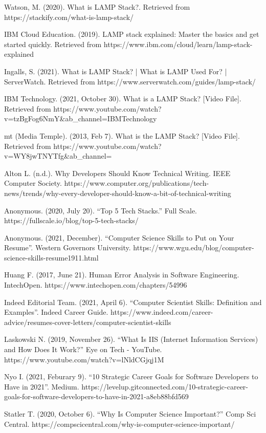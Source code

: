 \documentclass[a4paper, 11pt]{report}
\begin{document}
Watson, M. (2020). What is LAMP Stack?. Retrieved from https://stackify.com/what-is-lamp-stack/

IBM Cloud Education. (2019). LAMP stack explained: Master the basics and get started quickly. Retrieved from https://www.ibm.com/cloud/learn/lamp-stack-explained

Ingalls, S. (2021). What is LAMP Stack? | What is LAMP Used For? | ServerWatch. Retrieved from https://www.serverwatch.com/guides/lamp-stack/

IBM Technology. (2021, October 30). What is a LAMP Stack? [Video File]. Retrieved from https://www.youtube.com/watch?v=tzBgFog6NmY&ab_channel=IBMTechnology

mt (Media Temple). (2013, Feb 7). What is the LAMP Stack? [Video File]. Retrieved from https://www.youtube.com/watch?v=WY8jwTNYTfg&ab_channel=%

Alton L. (n.d.). Why Developers Should Know Technical Writing. IEEE Computer Society. 
    https://www.computer.org/publications/tech-news/trends/why-every-developer-should-know-a-bit-of-technical-writing
    
Anonymous. (2020, July 20). “Top 5 Tech Stacks.” Full Scale.
    https://fullscale.io/blog/top-5-tech-stacks/
 
Anonymous. (2021, December). “Computer Science Skills to Put on Your Resume”. Western Governors University.
    https://www.wgu.edu/blog/computer-science-skills-resume1911.html
    
Huang F. (2017, June 21). Human Error Analysis in Software Engineering. IntechOpen.
    https://www.intechopen.com/chapters/54996
    
Indeed Editorial Team. (2021, April 6). “Computer Scientist Skills: Definition and Examples”. Indeed Career Guide.
    https://www.indeed.com/career-advice/resumes-cover-letters/computer-scientist-skills
    
Laskowski N. (2019, November 26). “What Is IIS (Internet Information Services) and How Does It Work?” Eye on Tech - YouTube.
    https://www.youtube.com/watch?v=lNldCGjqj1M
    
Nyo I. (2021, Feburary 9). “10 Strategic Career Goals for Software Developers to Have in 2021”. Medium.
    https://levelup.gitconnected.com/10-strategic-career-goals-for-software-developers-to-have-in-2021-a8eb88bfd569
    
Statler T. (2020, October 6). “Why Is Computer Science Important?” Comp Sci Central. 
    https://compscicentral.com/why-is-computer-science-important/
 
\end{document}
